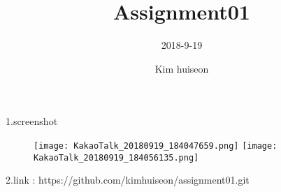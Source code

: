 \documentclass[10pt,a4paper]{article}
\title{Assignment01}
\author{2018-9-19}
\author{Kim huiseon}
\begin{document}
	\maketitle

	1.screenshot
	\begin{figure}[h]
	\centering	\texttt{[image: KakaoTalk\_20180919\_184047659.png]}
	\texttt{[image: KakaoTalk\_20180919\_184056135.png]}
	\end{figure}
	
	
	2.link : https://github.com/kimhuiseon/assignment01.git
\end{document}
